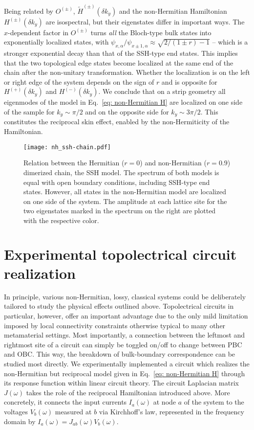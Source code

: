 Being related by $O^{(\pm)}$, $\tilde{H}^{(\pm)}(\delta k_y)$ and the non-Hermitian Hamiltonian $H^{(\pm)}(\delta k_y)$ are isospectral, but their eigenstates differ in important ways. The $x$-dependent factor in $O^{(\pm)}$ turns \emph{all} the Bloch-type bulk states into exponentially localized states, with $\psi_{x,\alpha}/\psi_{x\pm1,\alpha}\approx \sqrt{2/(1\pm r)-1}$ -- which is a stronger exponential decay than that of the SSH-type end states. This implies that the two topological edge states become localized at the same end of the chain after the non-unitary transformation. Whether the localization is on the left or right edge of the system depends on the sign of $r$ and is opposite for $H^{(+)}(\delta k_y)$ and $H^{(-)}(\delta k_y)$. We conclude that on a strip geometry all eigenmodes of the model in Eq.~\eqref{eq: non-Hermitian H} are localized on one side of the sample for $k_y \sim \pi/2$ and on the opposite side for $k_y \sim 3\pi/2$. This constitutes the reciprocal skin effect, enabled by the non-Hermiticity of the Hamiltonian. 

\begin{figure}[!htbp]
\centering
\texttt{[image: nh\_ssh-chain.pdf]}
\caption[Relation between the Hermitian ($r = 0$) and non-Hermitian ($r = 0.9$) dimerized chain, the SSH model.]{Relation between the Hermitian ($r = 0$) and non-Hermitian ($r = 0.9$) dimerized chain, the SSH model. The spectrum of both models is equal with open boundary conditions, including SSH-type end states. However, all states in the non-Hermitian model are localized on one side of the system. The amplitude at each lattice site for the two eigenstates marked in the spectrum on the right are plotted with the respective color.}
\label{fig: nonunitarytransform}
\end{figure}

\section{Experimental topolectrical circuit realization}
\label{sec:topocircuit}
In principle, various non-Hermitian, \ie lossy, classical systems could be deliberately tailored to study the physical effects outlined above. Topolectrical circuits in particular, however, offer an important advantage due to the only mild limitation imposed by local connectivity constraints otherwise typical to many other metamaterial settings. Most importantly, a connection between the leftmost and rightmost site of a circuit can simply be toggled on/off to change between PBC and OBC. This way, the breakdown of bulk-boundary correspondence can be studied most directly. We experimentally implemented a circuit which realizes the non-Hermitian but reciprocal model given in Eq.~\eqref{eq: non-Hermitian H} through its response function within linear circuit theory. The circuit Laplacian matrix $J (\omega)$ takes the role of the reciprocal Hamiltonian introduced above. More concretely, it connects the input currents $I_a (\omega)$ at node $a$ of the system to the voltages $V_b (\omega)$ measured at $b$ via Kirchhoff's law, represented in the frequency domain by $I_a (\omega)=J_{ab}(\omega) V_b(\omega)$.

